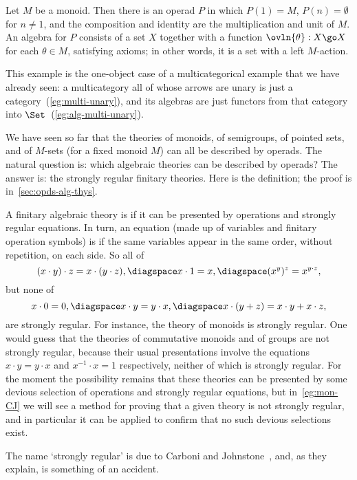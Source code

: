 \begin{example}
Let $M$ be a monoid.  Then there is an operad $P$ in which $P(1) = M$,
$P(n)= \emptyset$ for $n\neq 1$, and the composition and identity are the
multiplication and unit of $M$.  An algebra for $P$ consists of a set $X$
together with a function $\ovln{\theta}: X \go X$ for each $\theta\in M$,
satisfying axioms; in other words, it is a set with a left $M$-action.

This example is the one-object case of a multicategorical example that we
have already seen: a multicategory all of whose arrows are unary is just a
category~(\ref{eg:multi-unary}), and its algebras are just functors
from that category into $\Set$~(\ref{eg:alg-multi-unary}).
\end{example}

\begin{example} 
We have seen so far that the theories of monoids, of semigroups, of pointed
sets, and of $M$-sets (for a fixed monoid $M$) can all be described by
operads.  The natural question is: which algebraic
theories can be
described by operads?  The answer is: the strongly%
%
%
regular finitary
theories.  Here is the definition; the proof is
in~\ref{sec:opds-alg-thys}. 

A finitary algebraic theory is  if it can be
presented by operations and strongly regular equations.  In turn, an
equation (made up of variables and finitary operation symbols) is
 if the same variables appear in the same order,
without repetition, on each side. So all of
%
\[
(x\cdot y) \cdot z = x\cdot (y\cdot z),
\diagspace
x\cdot 1 = x,
\diagspace
(x^y)^z = x^{y\cdot z},
\]
but none of 
\[
x\cdot 0 = 0,
\diagspace
x\cdot y = y\cdot x,
\diagspace
x\cdot (y+z) = x\cdot y + x\cdot z,
\]
are strongly regular.  For instance, the theory of monoids is strongly
regular.  One would guess that the theories of commutative monoids and of
groups are not strongly regular, because their usual presentations involve
the equations $x\cdot y = y\cdot x$ and $x^{-1} \cdot x = 1$ respectively,
neither of which is strongly regular.  For the moment the possibility
remains that these theories can be presented by some devious selection of
operations and strongly regular equations, but in~\ref{eg:mon-CJ} we will
see a method for proving that a given theory is not strongly regular, and
in particular it can be applied to confirm that no such devious selections
exist.

The name `strongly regular' is due to Carboni and Johnstone~\cite{CJ}, and,
as they explain, is something of an accident.
\end{example}

